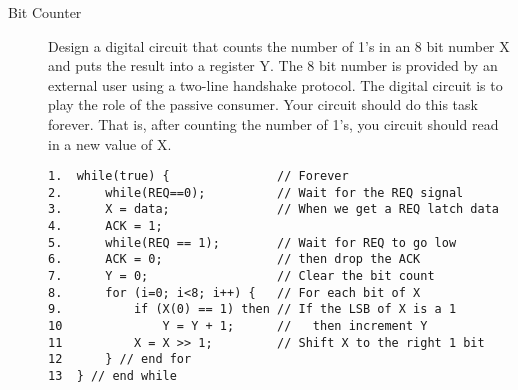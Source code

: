 \begin{description}
    \item[Bit Counter]
        Design a digital circuit that counts the number of 1's in an
        8 bit number X and puts the result into a register Y.
        The 8 bit number is provided by an external user using a two-line
        handshake protocol. The digital circuit is to play the role of the
        passive consumer.  Your circuit should do this task forever.  That
        is, after counting the number of 1's, you circuit should read
        in a new value of X.

\begin{verbatim}
1.  while(true) {               // Forever
2.      while(REQ==0);          // Wait for the REQ signal
3.      X = data;               // When we get a REQ latch data
4.      ACK = 1;
5.      while(REQ == 1);        // Wait for REQ to go low
6.      ACK = 0;                // then drop the ACK
7.      Y = 0;                  // Clear the bit count
8.      for (i=0; i<8; i++) {   // For each bit of X
9.          if (X(0) == 1) then // If the LSB of X is a 1
10              Y = Y + 1;      //   then increment Y
11          X = X >> 1;         // Shift X to the right 1 bit
12      } // end for
13  } // end while
\end{verbatim}



\end{description}
